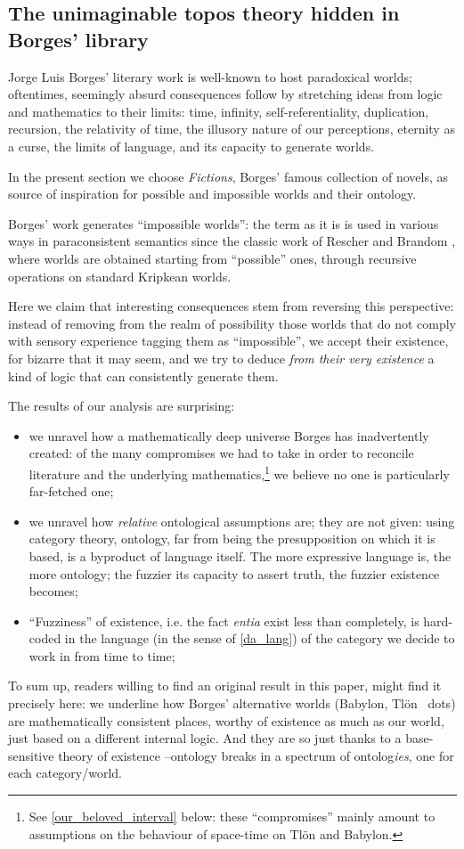 \subsection{The unimaginable topos theory hidden in Borges' library}
Jorge Luis Borges' literary work is well-known to host paradoxical worlds; oftentimes, seemingly absurd consequences follow by stretching ideas from logic and mathematics to their limits: time, infinity, self-referentiality, duplication, recursion, the relativity of time, the illusory nature of our perceptions, eternity as a curse, the limits of language, and its capacity to generate worlds.

In the present section we choose \emph{Fictions}, Borges' famous collection of novels, as source of inspiration for possible and impossible worlds and their ontology.

Borges' work generates ``impossible worlds'': the term as it is is used in various ways in paraconsistent semantics since the classic work of Rescher and Brandom \cite{10.2307/20127724}, where worlds are obtained starting from ``possible'' ones, through recursive operations on standard Kripkean worlds.

Here we claim that interesting consequences stem from reversing this perspective: instead of removing from the realm of possibility those worlds that do not comply with sensory experience tagging them as ``impossible'', we accept their existence, for bizarre that it may seem, and we try to deduce \emph{from their very existence} a kind of logic that can consistently generate them.

The results of our analysis are surprising:
\begin{itemize}
	\item we unravel how a mathematically deep universe Borges has inadvertently created: of the many compromises we had to take in order to reconcile literature and the underlying mathematics,\footnote{See \autoref{our_beloved_interval} below: these ``compromises'' mainly amount to assumptions on the behaviour of space-time on Tl\"on and Babylon.} we believe no one is particularly far-fetched one;
	\item we unravel how \emph{relative} ontological assumptions are; they are not given: using category theory, ontology, far from being the presupposition on which it is based, is a byproduct of language itself. The more expressive language is, the more ontology; the fuzzier its capacity to assert truth, the fuzzier existence becomes;
	\item ``Fuzziness'' of existence, i.e. the fact \emph{entia} exist less than completely, is hard-coded in the language (in the sense of \autoref{da_lang}) of the category we decide to work in from time to time;
\end{itemize}
To sum up, readers willing to find an original result in this paper, might find it precisely here: we underline how Borges' alternative worlds (Babylon, Tl\"on \ dots) are mathematically consistent places, worthy of existence as much as our world, just based on a different internal logic. And they are so just thanks to a base-sensitive theory of existence --ontology breaks in a spectrum of ontolog\emph{ies}, one for each category/world.

